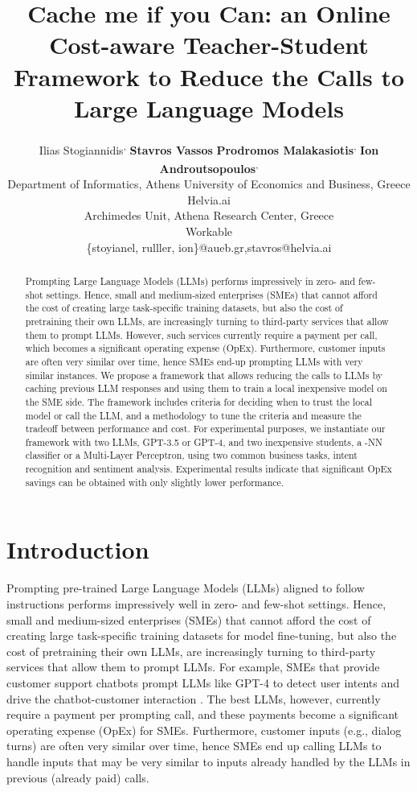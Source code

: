 \documentclass[11pt]{article}
\title{Cache me if you Can: an Online Cost-aware Teacher-Student Framework to Reduce the Calls to Large Language Models}
\author{Ilias Stogiannidis\textsuperscript{, } 
  {\bf Stavros Vassos}\textsuperscript{}
  {\bf Prodromos Malakasiotis}\textsuperscript{, }
  {\bf Ion Androutsopoulos}\textsuperscript{, }\\
  \textsuperscript{}Department of Informatics, Athens University of Economics and Business, Greece \\
  \textsuperscript{}Helvia.ai \\
  \textsuperscript{}Archimedes Unit, Athena Research Center, Greece \\
  \textsuperscript{} Workable \\
  \{stoyianel, rulller, ion\}@aueb.gr,\space stavros@helvia.ai}
\begin{document}
\maketitle 

\begin{abstract}
Prompting Large Language Models (LLMs) performs impressively in zero- and few-shot settings. Hence, small and medium-sized enterprises (SMEs) that cannot afford the cost of creating large task-specific training datasets, but also the cost of pretraining their own LLMs, are increasingly turning to third-party services that allow them to prompt LLMs. However, such services currently require a payment per call, which becomes a significant operating expense (OpEx). Furthermore, customer inputs are often very similar over time, hence SMEs end-up prompting LLMs with very similar instances. We propose a framework that allows reducing the calls to LLMs by caching previous LLM responses and using them to train a local inexpensive model on the SME side. The framework includes criteria for deciding when to trust the local model or call the LLM, and a methodology to tune the criteria and measure the tradeoff between performance and cost. For experimental purposes, we instantiate our framework with two LLMs, GPT-3.5 or GPT-4, and two inexpensive students, a -NN classifier or a Multi-Layer Perceptron, using two common business tasks, intent recognition and sentiment analysis. Experimental results indicate that significant OpEx savings can be obtained with only slightly lower performance. 
\end{abstract}


\section{Introduction}

Prompting pre-trained Large Language Models (LLMs) aligned to follow instructions \cite{InstructGPT,OpenAssistant} performs impressively well in zero- and few-shot settings. Hence, small and medium-sized enterprises (SMEs) that cannot afford the cost of creating large task-specific training datasets for model fine-tuning, but also the cost of pretraining their own LLMs, are increasingly turning to third-party services that allow them to prompt LLMs. For example, SMEs that provide customer support chatbots prompt LLMs like GPT-4 \cite{OpenAI2023GPT4TR} to detect user intents and drive the chatbot-customer interaction \cite{GPT2Dialogues}. The best LLMs, however, currently require a payment per prompting call, and these payments become a significant operating expense (OpEx) for SMEs. Furthermore, customer inputs (e.g., dialog turns) are often very similar over time, hence SMEs end up calling LLMs to handle inputs that may be very similar to inputs already handled by the LLMs in previous (already paid) calls. 
\end{document}
